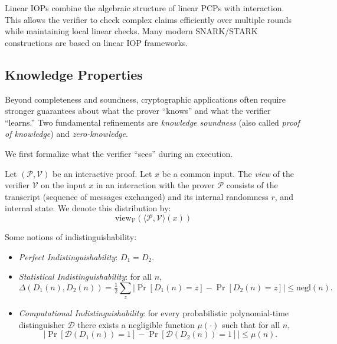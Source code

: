 \begin{remark}[Intuition]
Linear IOPs combine the algebraic structure of linear PCPs with interaction.  
This allows the verifier to check complex claims efficiently over multiple rounds while maintaining local linear checks.  
Many modern SNARK/STARK constructions are based on linear IOP frameworks.
\end{remark}

\subsection{Knowledge Properties}

Beyond completeness and soundness, cryptographic applications often require stronger guarantees
about what the prover ``knows'' and what the verifier ``learns.'' Two fundamental refinements are
\emph{knowledge soundness} (also called \emph{proof of knowledge}) and \emph{zero-knowledge}.

\myspace

\noindent We first formalize what the verifier ``sees'' during an execution.

\begin{definition}[View]
Let $(\mathcal{P}, \mathcal{V})$ be an interactive proof. Let $x$ be a common input. The \emph{view} of the verifier $\mathcal{V}$ on the input $x$ in an interaction with the prover $\mathcal{P}$ consists of the transcript (sequence of messages exchanged) and its internal randomness $r$, and internal state. We denote this distribution by:
$$
\mathrm{view}_{\mathcal{V}}(\langle \mathcal{P},\mathcal{V}\rangle(x))
$$
\end{definition}

\begin{definition}[Indistinguishability] Some notions of indistinguishability:
\begin{itemize}
\item \emph{Perfect Indistinguishability}: $D_1 = D_2$.
 \item \emph{Statistical Indistinguishability}: for all $n$,
  \[
  \Delta(D_1(n),D_2(n)) = \tfrac{1}{2} \sum_{z} \big| \Pr[D_1(n)=z] - \Pr[D_2(n)=z] \big|
  \leq \text{negl}(n).
  \]

  \item \emph{Computational Indistinguishability}: for every probabilistic polynomial-time distinguisher $\mathcal{D}$ there exists a negligible function $\mu(\cdot)$ such that for all $n$,
  \[
  \big| \Pr[\mathcal{D}(D_1(n))=1] - \Pr[\mathcal{D}(D_2(n))=1] \big| \leq \mu(n).
  \]
\end{itemize}
\end{definition}

